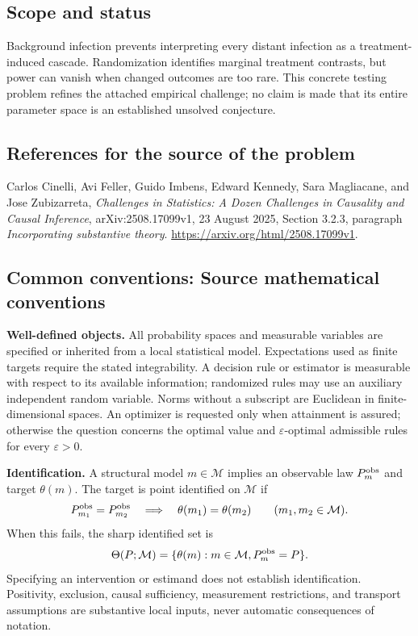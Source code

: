 \documentclass[11pt,a4paper]{article}
\begin{document}
\subsection*{Scope and status}
Background infection prevents interpreting every distant infection as a treatment-induced cascade. Randomization identifies marginal treatment contrasts, but power can vanish when changed outcomes are too rare. This concrete testing problem refines the attached empirical challenge; no claim is made that its entire parameter space is an established unsolved conjecture.
\subsection*{References for the source of the problem}
Carlos Cinelli, Avi Feller, Guido Imbens, Edward Kennedy, Sara Magliacane, and Jose Zubizarreta, \emph{Challenges in Statistics: A Dozen Challenges in Causality and Causal Inference}, arXiv:2508.17099v1, 23 August 2025, Section 3.2.3, paragraph \emph{Incorporating substantive theory}. \url{https://arxiv.org/html/2508.17099v1}.

\subsection*{Common conventions: Source mathematical conventions}

\textbf{Well-defined objects.}
All probability spaces and measurable variables are specified or inherited
from a local statistical model. Expectations used as finite targets require
the stated integrability. A decision rule or estimator is measurable with
respect to its available information; randomized rules may use an auxiliary
independent random variable. Norms without a subscript are Euclidean in
finite-dimensional spaces. An optimizer is requested only when attainment
is assured; otherwise the question concerns the optimal value and
$\varepsilon$-optimal admissible rules for every $\varepsilon>0$.

\textbf{Identification.}
A structural model $m\in\mathcal M$ implies an observable law
$P_m^{\rm obs}$ and target $\theta(m)$. The target is point identified on
$\mathcal M$ if
\[
 P_{m_1}^{\rm obs}=P_{m_2}^{\rm obs}
 \quad\Longrightarrow\quad\theta(m_1)=\theta(m_2)
 \qquad(m_1,m_2\in\mathcal M).
\]
When this fails, the sharp identified set is
\[
 \Theta(P;\mathcal M)=\{\theta(m):m\in\mathcal M,
                                  P_m^{\rm obs}=P\}.
\]
Specifying an intervention or estimand does not establish identification.
Positivity, exclusion, causal sufficiency, measurement restrictions, and
transport assumptions are substantive local inputs, never automatic
consequences of notation.
\end{document}
